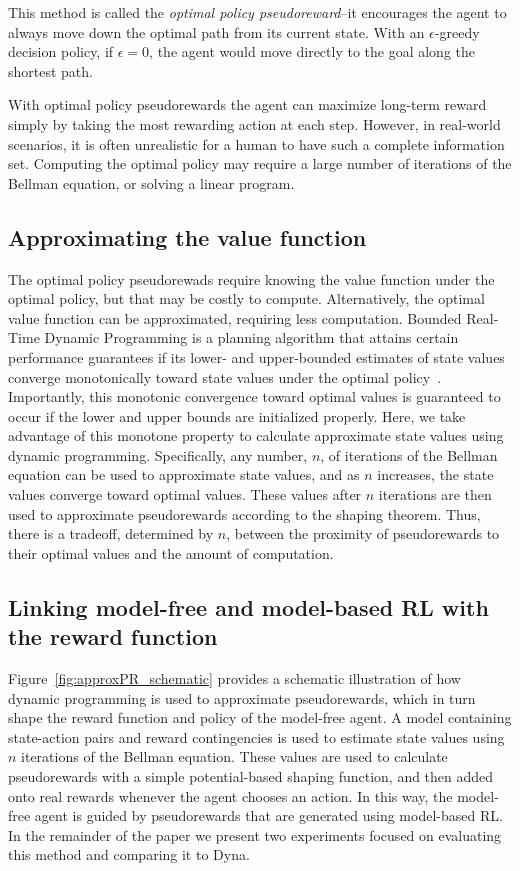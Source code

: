 \documentclass[letterpaper]{article}
\begin{document}
This method is called the \textit{optimal policy pseudoreward}--it encourages the agent to always move down the optimal path from its current state. With an $\epsilon$-greedy decision policy, if $\epsilon = 0$, the agent would move directly to the goal along the shortest path.

With optimal policy pseudorewards the agent can maximize long-term reward simply by taking the most rewarding action at each step. However, in real-world scenarios, it is often unrealistic for a human to have such a complete information set. Computing the optimal policy may require a large number of iterations of the Bellman equation, or solving a linear program.

\subsection{Approximating the value function}

The optimal policy pseudorewads require knowing the value function under the optimal policy, but that may be costly to compute. Alternatively, the optimal value function can be approximated, requiring less computation. Bounded Real-Time Dynamic Programming is a planning algorithm that attains certain performance guarantees if its lower- and upper-bounded estimates of state values converge monotonically toward state values under the optimal policy~\cite{mcmahan2005bounded}. Importantly, this monotonic convergence toward optimal values is guaranteed to occur if the lower and upper bounds are initialized properly. Here, we take advantage of this monotone property to calculate approximate state values using dynamic programming. Specifically, any number, $n$, of iterations of the Bellman equation can be used to approximate state values, and as $n$ increases, the state values converge toward optimal values. These values after $n$ iterations are then used to approximate pseudorewards according to the shaping theorem. Thus, there is a tradeoff, determined by $n$, between the proximity of pseudorewards to their optimal values and the amount of computation.

\subsection{Linking model-free and model-based RL with the reward function}

Figure~\ref{fig:approxPR_schematic} provides a schematic illustration of how dynamic programming is used to approximate pseudorewards, which in turn shape the reward function and policy of the model-free agent. A model containing state-action pairs and reward contingencies is used to estimate state values using $n$ iterations of the Bellman equation. These values are used to calculate pseudorewards with a simple potential-based shaping function, and then added onto real rewards whenever the agent chooses an action. In this way, the model-free agent is guided by pseudorewards that are generated using model-based RL. In the remainder of the paper we present two experiments focused on evaluating this method and comparing it to Dyna.
\end{document}
